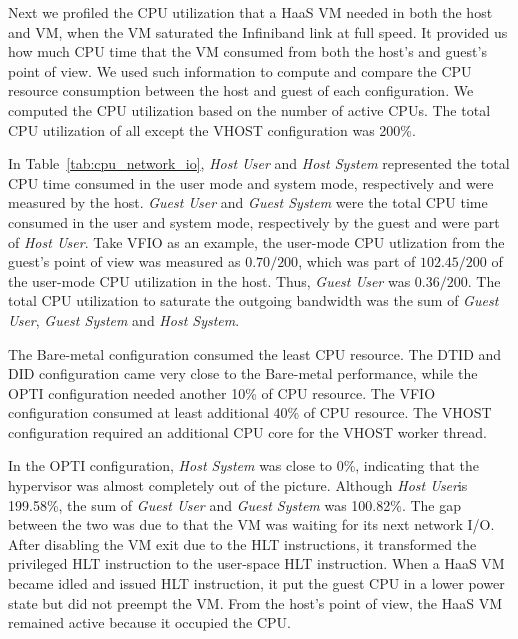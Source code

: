 Next we profiled the CPU utilization that a HaaS VM needed in
both the host and VM, when the VM saturated the Infiniband
link at full speed. It provided us how much CPU time that the
VM consumed from both the host's and guest's point of view. We
used such information to compute and compare the CPU resource
consumption between the host and guest of each configuration.
We computed the CPU utilization based on the number of active
CPUs. The total CPU utilization of all except the VHOST
configuration was 200\%.

In Table~\ref{tab:cpu_network_io}, \emph{Host User} and
\emph{Host System} represented the total CPU time consumed in
the user mode and system mode, respectively and were measured
by the host. \emph{Guest User} and \emph{Guest System} were
the total CPU time consumed in the user and system mode,
respectively by the guest and were part of \emph{Host User}.
Take VFIO as an example, the user-mode CPU utlization from the
guest's point of view was measured as $0.70/200$, which was
part of $102.45/200$ of the user-mode CPU utilization in the
host. Thus, \emph{Guest User} was $0.36/200$. The total CPU
utilization to saturate the outgoing bandwidth was the sum of
\emph{Guest User}, \emph{Guest System} and \emph{Host System}.

The Bare-metal configuration consumed the least CPU resource.
The DTID and DID configuration came very close to the
Bare-metal performance, while the OPTI configuration needed
another 10\% of CPU resource. The VFIO configuration consumed
at least additional 40\% of CPU resource. The VHOST
configuration required an additional CPU core for the VHOST
worker thread.

In the OPTI configuration, \emph{Host System} was close to
0\%, indicating that the hypervisor was almost completely out
of the picture. Although \emph{Host User}is 199.58\%, the sum
of \emph{Guest User} and \emph{Guest System} was 100.82\%.
The gap between the two was due to that the VM was waiting for
its next network I/O. After disabling the VM exit due to the
HLT instructions, it transformed the privileged HLT
instruction to the user-space HLT instruction. When a HaaS VM
became idled and issued HLT instruction, it put the guest CPU
in a lower power state but did not preempt the VM. From the
host's point of view, the HaaS VM remained active because it
occupied the CPU.


